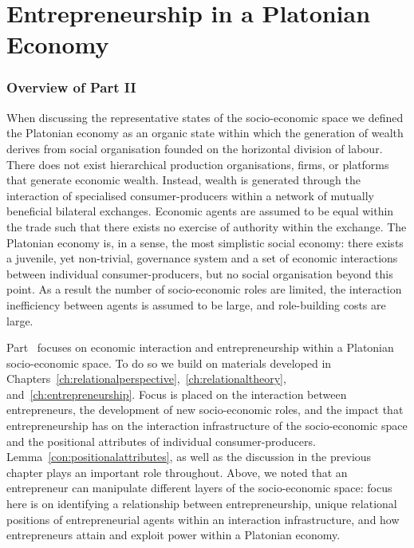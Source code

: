 \part{Entrepreneurship in a Platonian Economy} 
\label{part:entrepreneurshipPlatonianEconomy}

\section*{Overview of Part II}

When discussing the representative states of the socio-economic space we defined the Platonian economy as an organic state within which the generation of wealth derives from social organisation founded on the horizontal division of labour. There does not exist hierarchical production organisations, firms, or platforms that generate economic wealth. Instead, wealth is generated through the interaction of specialised consumer-producers within a network of mutually beneficial bilateral exchanges. Economic agents are assumed to be equal within the trade such that there exists no exercise of authority within the exchange. The Platonian economy is, in a sense, the most simplistic social economy: there exists a juvenile, yet non-trivial, governance system and a set of economic interactions between individual consumer-producers, but no social organisation beyond this point. As a result the number of socio-economic roles are limited, the interaction inefficiency between agents is assumed to be large, and role-building costs are large.

Part~\ref{part:entrepreneurshipPlatonianEconomy} focuses on economic interaction and entrepreneurship within a Platonian socio-economic space. To do so we build on materials developed in Chapters~\ref{ch:relationalperspective},~\ref{ch:relationaltheory}, and~\ref {ch:entrepreneurship}. Focus is placed on the interaction between entrepreneurs, the development of new socio-economic roles, and the impact that entrepreneurship has on the interaction infrastructure of the socio-economic space and the positional attributes of individual consumer-producers. Lemma~\ref{con:positionalattributes}, as well as the discussion in the previous chapter plays an important role throughout. Above, we noted that an entrepreneur can manipulate different layers of the socio-economic space: focus here is on identifying a relationship between entrepreneurship, unique relational positions of entrepreneurial agents within an interaction infrastructure, and how entrepreneurs attain and exploit power within a Platonian economy.

